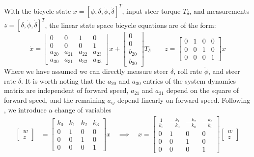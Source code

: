 \documentclass[letterpaper,11pt]{article}
\begin{document}
With the bicycle state $x = \left[\phi, \delta, \dot{\phi},
\dot{\delta}\right]^T$, input steer torque $T_\delta$, and measurements $z =
[\delta, \dot{\phi}, \dot{\delta}]^T$,
the linear state space bicycle equations are of the form:
\begin{equation*}
\dot{x} =\left[\begin{smallmatrix}0 & 0 & 1 & 0\\0 & 0 & 0 & 1\\a_{20} & a_{21} &
a_{22} & a_{23}\\a_{30} & a_{31} & a_{32} & a_{33}\end{smallmatrix}\right] x +
\left[\begin{smallmatrix}0\\0\\b_{20}\\b_{30}\end{smallmatrix}\right] T_\delta
\qquad
z = \left[\begin{smallmatrix}0 & 1 & 0 & 0\\ 0 & 0 & 1 & 0\\ 0 & 0 & 0 &
1\end{smallmatrix}\right] x
\end{equation*}
Where we have assumed we can directly measure steer $\delta$, roll rate
$\dot{\phi}$, and steer rate $\dot{\delta}$.  It is worth noting that the
$a_{20}$ and $a_{30}$ entries of the system dynamics matrix are independent of
forward speed, $a_{21}$ and $a_{31}$ depend on the square of forward speed, and
the remaining $a_{ij}$ depend linearly on forward speed.  Following
\citet*{Bryson1970}, we introduce a change of variables
\begin{align*}
\left[\begin{smallmatrix}w \\ z\end{smallmatrix}\right] &=
\left[\begin{smallmatrix}k_0 & k_1 & k_2 & k_3 \\ 0 & 1 & 0 & 0\\ 0 & 0 & 1 & 0\\ 0 & 0 & 0 &
1\end{smallmatrix}\right] x  \quad\implies\quad
x =
\left[\begin{smallmatrix}\frac{1}{k_{0}} & - \frac{k_{1}}{k_{0}} & -
  \frac{k_{2}}{k_{0}} & - \frac{k_{3}}{k_{0}}\\0 & 1 & 0 & 0\\0 & 0 & 1 & 0\\0
  & 0 & 0 & 1\end{smallmatrix}\right]\left[\begin{smallmatrix} w \\ z\end{smallmatrix}\right]
\end{align*}
\end{document}
